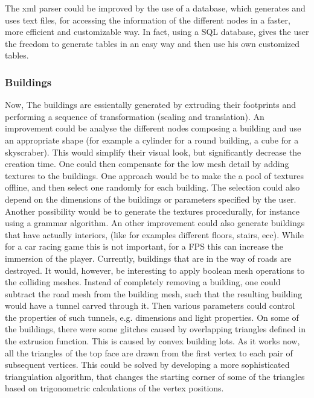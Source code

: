 \documentclass[conference]{IEEEtran}
\begin{document}
The xml parser could be improved by the use of a database, which generates and uses text files, for accessing the information of the different nodes in a faster, more efficient and customizable way. In fact, using a SQL database, gives the user the freedom to generate tables in an easy way and then use his own customized tables.

\subsubsection{Buildings}
Now, The buildings are essientally generated by extruding their footprints and performing a sequence of transformation (scaling and translation). An improvement could be analyse the different nodes composing a building and use an appropriate shape (for example a cylinder for a round building, a cube for a skyscraber). This would simplify their visual look, but significantly decrease the creation time. One could then compensate for the low mesh detail by adding textures to the buildings. One approach would be to make the a pool of textures offline, and then select one randomly for each building. The selection could also depend on the dimensions of the buildings or parameters specified by the user. Another possibility would be to generate the textures procedurally, for instance using a grammar algorithm. An other improvement could also generate buildings that have actually interiors, (like for examples different floors, stairs, ecc). While for a car racing game this is not important, for a FPS this can increase the immersion of the player. \newline\newline
Currently, buildings that are in the way of roads are destroyed. It would, however, be interesting to apply boolean mesh operations to the colliding meshes. Instead of completely removing a building, one could subtract the road mesh from the building mesh, such that the resulting building would have a tunnel carved through it. Then various parameters could control the properties of such tunnels, e.g. dimensions and light properties.\newline\newline
 On some of the buildings, there were some glitches caused by overlapping triangles defined in the extrusion function. This is caused by convex building lots. As it works now, all the triangles of the top face are drawn from the first vertex to each pair of subsequent vertices. This could be solved by developing a more sophisticated triangulation algorithm, that changes the starting corner of some of the triangles based on trigonometric calculations of the vertex positions. 
\end{document}

